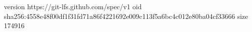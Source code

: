 version https://git-lfs.github.com/spec/v1
oid sha256:4558e48f00df1f31fd71a86f4221692e009c113f5a6bc4c012e80ba04cf33666
size 174916
